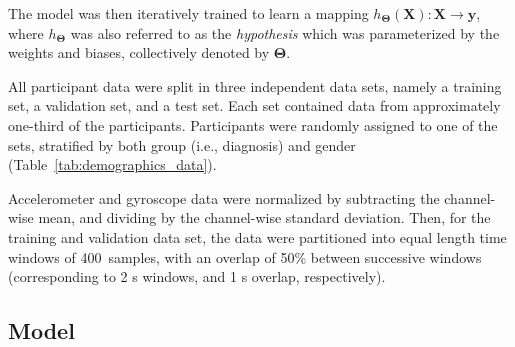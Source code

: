\documentclass[sensors,article,submit,pdftex,moreauthors]{Definitions/mdpi}
\begin{document}
The model was then iteratively trained to learn a mapping $h_{\mathbf{\Theta}}(\mathbf{X}): \mathbf{X} \rightarrow \mathbf{y}$, where $h_{\mathbf{\Theta}}$ was also referred to as the \emph{hypothesis} which was parameterized by the weights and biases, collectively denoted by $\mathbf{\Theta}$.

All participant data were split in three independent data sets, namely a training set, a validation set, and a test set. Each set contained data from approximately one-third of the participants. Participants were randomly assigned to one of the sets, stratified by both group (i.e., diagnosis) and gender (Table~\ref{tab:demographics_data}).

Accelerometer and gyroscope data were normalized by subtracting the channel-wise mean, and dividing by the channel-wise standard deviation. Then, for the training and validation data set, the data were partitioned into equal length time windows \cite{Filtjens2020} of 400~samples, with an overlap of 50\% between successive windows (corresponding to 2 s windows, and 1 s overlap, respectively).

\subsection{Model \label{subsec:Model}}
\end{document}
